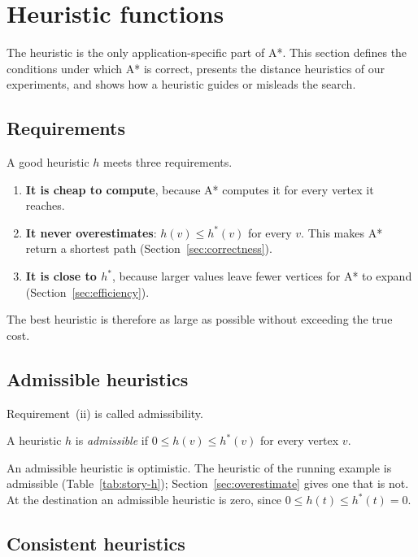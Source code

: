 \section{Heuristic functions}\label{sec:heuristics}

The heuristic is the only application-specific part of A*. This section defines
the conditions under which A* is correct, presents the distance heuristics of
our experiments, and shows how a heuristic guides or misleads the search.

\subsection{Requirements}\label{sec:h-requirements}

A good heuristic $h$ meets three requirements.
\begin{enumerate}[label=(\roman*)]
    \item \textbf{It is cheap to compute}, because A* computes it for every
    vertex it reaches.
  \item \textbf{It never overestimates}: $h(v) \le h^{*}(v)$ for every $v$. This
    makes A* return a shortest path (Section~\ref{sec:correctness}).
  \item \textbf{It is close to $h^{*}$}, because larger values leave fewer
    vertices for A* to expand (Section~\ref{sec:efficiency}).
\end{enumerate}
The best heuristic is therefore as large as possible without exceeding the
true cost.

\subsection{Admissible heuristics}\label{sec:admissible}

Requirement~(ii) is called admissibility.

\begin{definition}\label{def:admissible}
A heuristic $h$ is \emph{admissible} if $0 \le h(v) \le h^{*}(v)$ for every
vertex $v$.
\end{definition}

An admissible heuristic is optimistic. The heuristic of the running example
is admissible (Table~\ref{tab:story-h}); Section~\ref{sec:overestimate} gives
one that is not. At the destination an admissible heuristic is zero, since
$0 \le h(t) \le h^{*}(t) = 0$.

\subsection{Consistent heuristics}\label{sec:consistent}

